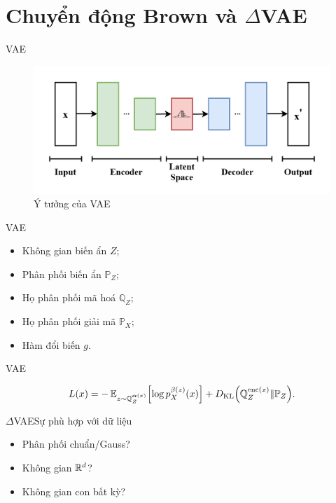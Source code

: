 \documentclass[tocsection,footlinesection,aspectratio=169,mathserif]{beamer}
\begin{document}
\section{Chuyển động Brown và $\Delta$VAE}

\begin{frame}[nosection]{VAE}
	\begin{figure}
		\centering
		\includegraphics[height=\graphicht]{figures/vae.png}
		\caption{Ý tưởng của VAE}
	\end{figure}
\end{frame}

\begin{frame}{VAE}
	\begin{itemize}
		\item Không gian biến ẩn $Z$;
		\item Phân phối biến ẩn $\mathbb{P}_{Z}$;
		\item Họ phân phối mã hoá $\mathbb{Q}_{Z}$;
		\item Họ phân phối giải mã $\mathbb{P}_{X}$;
		\item Hàm đổi biến $g$.
	\end{itemize}
\end{frame}

\begin{frame}{VAE}
	\begin{defn}
		\begin{equation}
			L\left(x\right)=-\Ex_{z\sim\mathbb{Q}_{Z}^{\boldsymbol{\alpha}\left(x\right)}}\left[\log p_{X}^{\beta\left(z\right)}\left(x\right)\right]+D_{\mathrm{KL}}\left(\mathbb{Q}_{Z}^{\Enc\left(x\right)}\Vert\mathbb{P}_{Z}\right).
		\end{equation}
	\end{defn}
\end{frame}


\begin{frame}{$\Delta$VAE}{Sự phù hợp với dữ liệu}
	\begin{itemize}
		\item Phân phối chuẩn/Gauss?
		\item Không gian $\mathbb{R}^d$?
		\item Không gian con bất kỳ?
	\end{itemize}
\end{frame}
\end{document}
